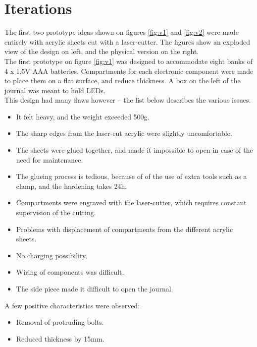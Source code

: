 \section{Iterations}

The first two prototype ideas shown on figures \ref{fig:v1} and \ref{fig:v2} were made entirely with acrylic sheets cut with a laser-cutter. The figures show an exploded view of the design on left, and the physical version on the right. \\

The first prototype on figure \ref{fig:v1} was designed to accommodate eight banks of 4 x 1,5V AAA batteries. Compartments for each electronic component were made to place them on a flat surface, and reduce thickness. A box on the left of the journal was meant to hold LEDs. \\
This design had many flaws however -- the list below describes the various issues.

\begin{itemize} \itemsep0em
  \item It felt heavy, and the weight exceeded 500g.
  \item The sharp edges from the laser-cut acrylic were slightly uncomfortable.
  \item The sheets were glued together, and made it impossible to open in case of the need for maintenance.
  \item The glueing process is tedious, because of of the use of extra tools such as a clamp, and the hardening takes 24h.
  \item Compartments were engraved with the laser-cutter, which requires constant supervision of the cutting.
  \item Problems with displacement of compartments from the different acrylic sheets.
  \item No charging possibility.
  \item Wiring of components was difficult.
  \item The side piece made it difficult to open the journal.
\end{itemize}

A few positive characteristics were observed:
\begin{itemize} \itemsep0em
  \item Removal of protruding bolts.
  \item Reduced thickness by 15mm.
\end{itemize}

\clearpage

